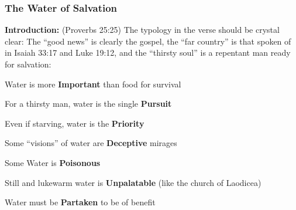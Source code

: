 \subsubsection{The Water of Salvation}
\textbf{Introduction: }(Proverbs 25:25) The typology in the verse should be crystal clear: The ``good news'' is clearly the gospel, the ``far country'' is that spoken of in Isaiah 33:17 and Luke 19:12, and the ``thirsty soul'' is a repentant man ready for salvation: 
\begin{compactenum}[I.]
    \item Water is more \textbf{Important} than food for survival
    \item For a thirsty man, water is the single \textbf{Pursuit} 
    \item Even if starving, water is the \textbf{Priority} 
    \item Some ``visions'' of water are \textbf{Deceptive} mirages
    \item Some Water is \textbf{Poisonous}
    \item Still and lukewarm water is \textbf{Unpalatable} (like the church of Laodicea)
    \item Water must be \textbf{Partaken} to be of benefit 
\end{compactenum}

